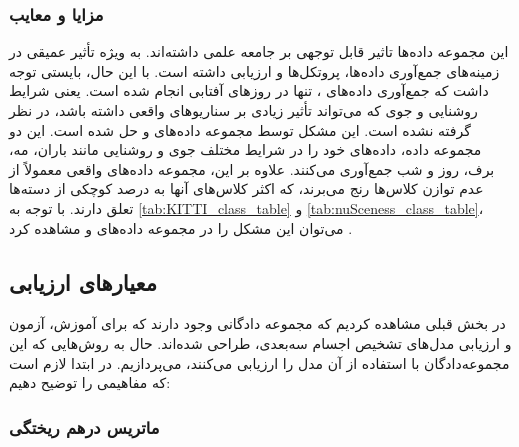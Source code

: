 \subsubsection{مزایا و معایب}

این مجموعه‌ داده‌ها تاثیر قابل توجهی بر جامعه علمی داشته‌اند. به ویژه  تأثیر عمیقی در زمینه‌های جمع‌آوری داده‌ها، پروتکل‌ها و ارزیابی‌ داشته است. با این حال، بایستی توجه داشت که جمع‌آوری داده‌های ، تنها در روزهای آفتابی انجام شده است. یعنی شرایط روشنایی و جوی که می‌تواند تأثیر زیادی بر سناریوهای واقعی داشته باشد، در نظر گرفته نشده است. این مشکل توسط مجموعه داده‌های  و  حل شده است. این دو مجموعه‌ داده، داده‌های خود را در شرایط مختلف جوی و روشنایی مانند باران، مه، برف، روز و شب جمع‌آوری می‌کنند. علاوه بر این، مجموعه‌ داده‌های واقعی معمولاً از عدم توازن کلاس‌ها رنج می‌برند، که اکثر کلاس‌های آنها به درصد کوچکی از دسته‌ها تعلق دارند. با توجه به \cref{tab:KITTI_class_table} و \cref{tab:nuSceness_class_table}، می‌توان این مشکل را در مجموعه‌ داده‌های  و  مشاهده کرد \cite{qian20223d}. 

\subsection{معیارهای ارزیابی}

در بخش قبلی مشاهده کردیم که مجموعه دادگانی وجود دارند که برای آموزش، آزمون و ارزیابی مدل‌های تشخیص اجسام سه‌بعدی،‌ طراحی شده‌اند. حال به روش‌هایی که این مجموعه‌دادگان با استفاده از آن مدل را ارزیابی می‌کنند، می‌پردازیم. در ابتدا لازم است که مفاهیمی را توضیح دهیم:

\subsubsection{ماتریس درهم‌ ریختگی}

